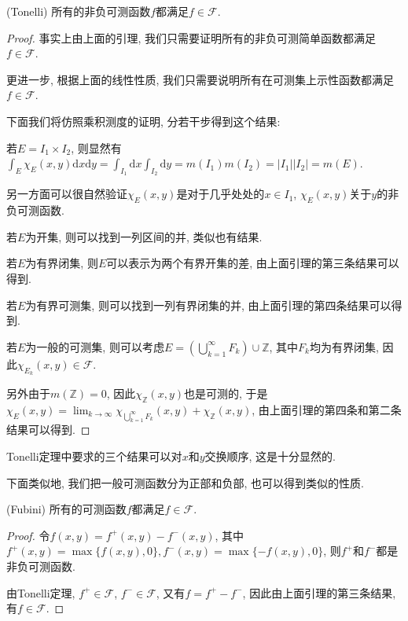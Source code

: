 \documentclass[theorem=false,mathfont=none,openany,sub3section]{easybook}
\begin{document}
\begin{theorem}
  (Tonelli) 所有的非负可测函数$f$都满足$f\in\mathcal{F}$.\par
\end{theorem}

\begin{proof}
  事实上由上面的引理, 我们只需要证明所有的非负可测简单函数都满足$f\in \mathcal{F}$. \par
  更进一步, 根据上面的线性性质, 我们只需要说明所有在可测集上示性函数都满足$f\in \mathcal{F}$. \par
  下面我们将仿照乘积测度的证明, 分若干步得到这个结果:\par
  若$E=I_1\times I_2$, 则显然有$\int_{E}\chi_E(x,y)\mathrm{d}x\mathrm{d}y=\int_{I_1}\mathrm{d}x\int_{I_2}\mathrm{d}y=m(I_1)m(I_2)=|I_1||I_2|=m(E)$.\par
  另一方面可以很自然验证$\chi_{E}(x,y)$是对于几乎处处的$x\in I_1$, $\chi_{E}(x,y)$关于$y$的非负可测函数.\par
  若$E$为开集, 则可以找到一列区间的并, 类似也有结果.\par
  若$E$为有界闭集, 则$E$可以表示为两个有界开集的差, 由上面引理的第三条结果可以得到.\par
  若$E$为有界可测集, 则可以找到一列有界闭集的并, 由上面引理的第四条结果可以得到.\par
  若$E$为一般的可测集, 则可以考虑$E=\left(\bigcup_{k=1}^{\infty}F_k\right)\cup \mathbb{Z}$, 其中$F_k$均为有界闭集, 因此$\chi_{E_k}(x,y)\in \mathcal{F}$.\par
  另外由于$m(\mathbb{Z})=0$, 因此$\chi_{\mathbb{Z}}(x,y)$也是可测的, 于是$\chi_{E}(x,y)=\lim_{k \to \infty}\chi_{\bigcup_{k=1}^{\infty} F_k}(x,y)+\chi_{\mathbb{Z}}(x,y)$, 由上面引理的第四条和第二条结果可以得到.\par
\end{proof}

\begin{remark}
  Tonelli定理中要求的三个结果可以对$x$和$y$交换顺序, 这是十分显然的.\par
\end{remark}

下面类似地, 我们把一般可测函数分为正部和负部, 也可以得到类似的性质.\par

\begin{theorem}
  (Fubini) 所有的可测函数$f$都满足$f\in\mathcal{F}$.\par
\end{theorem}

\begin{proof}
  令$f(x,y)=f^{+}(x,y)-f^{-}(x,y)$, 其中$f^{+}(x,y)=\max\{f(x,y),0\}, f^{-}(x,y)=\max\{-f(x,y),0\}$, 则$f^{+}$和$f^{-}$都是非负可测函数.\par
  由Tonelli定理, $f^{+}\in \mathcal{F}$, $f^{-}\in \mathcal{F}$, 又有$f=f^{+}-f^{-}$, 因此由上面引理的第三条结果, 有$f\in \mathcal{F}$.\par
\end{proof}
\end{document}
